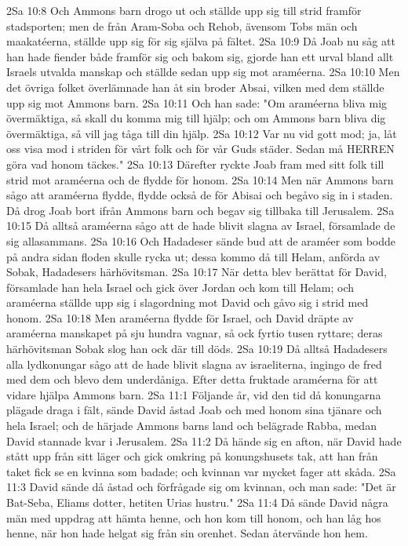 2Sa 10:8  Och Ammons barn drogo ut och ställde upp sig till strid framför stadsporten; men de från Aram-Soba och Rehob, ävensom Tobs män och maakatéerna, ställde upp sig för sig själva på fältet.
2Sa 10:9  Då Joab nu såg att han hade fiender både framför sig och bakom sig, gjorde han ett urval bland allt Israels utvalda manskap och ställde sedan upp sig mot araméerna.
2Sa 10:10  Men det övriga folket överlämnade han åt sin broder Absai, vilken med dem ställde upp sig mot Ammons barn.
2Sa 10:11  Och han sade: "Om araméerna bliva mig övermäktiga, så skall du komma mig till hjälp; och om Ammons barn bliva dig övermäktiga, så vill jag tåga till din hjälp.
2Sa 10:12  Var nu vid gott mod; ja, låt oss visa mod i striden för vårt folk och för vår Guds städer. Sedan må HERREN göra vad honom täckes."
2Sa 10:13  Därefter ryckte Joab fram med sitt folk till strid mot araméerna och de flydde för honom.
2Sa 10:14  Men när Ammons barn sågo att araméerna flydde, flydde också de för Abisai och begåvo sig in i staden. Då drog Joab bort ifrån Ammons barn och begav sig tillbaka till Jerusalem.
2Sa 10:15  Då alltså araméerna sågo att de hade blivit slagna av Israel, församlade de sig allasammans.
2Sa 10:16  Och Hadadeser sände bud att de araméer som bodde på andra sidan floden skulle rycka ut; dessa kommo då till Helam, anförda av Sobak, Hadadesers härhövitsman.
2Sa 10:17  När detta blev berättat för David, församlade han hela Israel och gick över Jordan och kom till Helam; och araméerna ställde upp sig i slagordning mot David och gåvo sig i strid med honom.
2Sa 10:18  Men araméerna flydde för Israel, och David dräpte av araméerna manskapet på sju hundra vagnar, så ock fyrtio tusen ryttare; deras härhövitsman Sobak slog han ock där till döds.
2Sa 10:19  Då alltså Hadadesers alla lydkonungar sågo att de hade blivit slagna av israeliterna, ingingo de fred med dem och blevo dem underdåniga. Efter detta fruktade araméerna för att vidare hjälpa Ammons barn.
2Sa 11:1  Följande år, vid den tid då konungarna plägade draga i fält, sände David åstad Joab och med honom sina tjänare och hela Israel; och de härjade Ammons barns land och belägrade Rabba, medan David stannade kvar i Jerusalem.
2Sa 11:2  Då hände sig en afton, när David hade stått upp från sitt läger och gick omkring på konungshusets tak, att han från taket fick se en kvinna som badade; och kvinnan var mycket fager att skåda.
2Sa 11:3  David sände då åstad och förfrågade sig om kvinnan, och man sade: "Det är Bat-Seba, Eliams dotter, hetiten Urias hustru."
2Sa 11:4  Då sände David några män med uppdrag att hämta henne, och hon kom till honom, och han låg hos henne, när hon hade helgat sig från sin orenhet. Sedan återvände hon hem.
